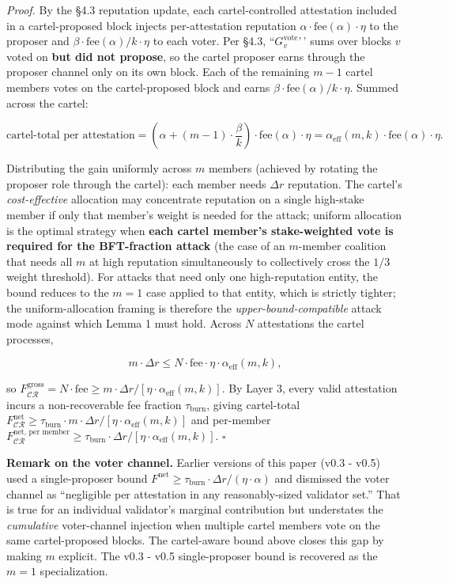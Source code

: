 \documentclass[
  11pt,
]{article}
\begin{document}
\emph{Proof.} By the §4.3 reputation update, each cartel-controlled
attestation included in a cartel-proposed block injects per-attestation
reputation \(\alpha \cdot \text{fee}(\alpha) \cdot \eta\) to the
proposer and \(\beta \cdot \text{fee}(\alpha) / k \cdot \eta\) to each
voter. Per §4.3, ``\(G_v^{\text{vote}}\)'\,' sums over blocks \(v\)
voted on \textbf{but did not propose}, so the cartel proposer earns
through the proposer channel only on its own block. Each of the
remaining \(m - 1\) cartel members votes on the cartel-proposed block
and earns \(\beta \cdot \text{fee}(\alpha) / k \cdot \eta\). Summed
across the cartel:

\[\text{cartel-total per attestation} = \left(\alpha + (m - 1) \cdot \frac{\beta}{k}\right) \cdot \text{fee}(\alpha) \cdot \eta = \alpha_{\text{eff}}(m, k) \cdot \text{fee}(\alpha) \cdot \eta.\]

Distributing the gain uniformly across \(m\) members (achieved by
rotating the proposer role through the cartel): each member needs
\(\Delta r\) reputation. The cartel's \emph{cost-effective} allocation
may concentrate reputation on a single high-stake member if only that
member's weight is needed for the attack; uniform allocation is the
optimal strategy when \textbf{each cartel member's stake-weighted vote
is required for the BFT-fraction attack} (the case of an \(m\)-member
coalition that needs all \(m\) at high reputation simultaneously to
collectively cross the \(1/3\) weight threshold). For attacks that need
only one high-reputation entity, the bound reduces to the \(m = 1\) case
applied to that entity, which is strictly tighter; the
uniform-allocation framing is therefore the
\emph{upper-bound-compatible} attack mode against which Lemma 1 must
hold. Across \(N\) attestations the cartel processes,

\[m \cdot \Delta r \leq N \cdot \text{fee} \cdot \eta \cdot \alpha_{\text{eff}}(m, k),\]

so
\(F_{\mathcal{CR}}^{\text{gross}} = N \cdot \text{fee} \geq m \cdot \Delta r / [\eta \cdot \alpha_{\text{eff}}(m, k)]\).
By Layer 3, every valid attestation incurs a non-recoverable fee
fraction \(\tau_{\text{burn}}\), giving cartel-total
\(F_{\mathcal{CR}}^{\text{net}} \geq \tau_{\text{burn}} \cdot m \cdot \Delta r / [\eta \cdot \alpha_{\text{eff}}(m, k)]\)
and per-member
\(F_{\mathcal{CR}}^{\text{net, per member}} \geq \tau_{\text{burn}} \cdot \Delta r / [\eta \cdot \alpha_{\text{eff}}(m, k)]\).
\(\square\)

\textbf{Remark on the voter channel.} Earlier versions of this paper
(v0.3 - v0.5) used a single-proposer bound
\(F^{\text{net}} \geq \tau_{\text{burn}} \cdot \Delta r / (\eta \cdot \alpha)\)
and dismissed the voter channel as ``negligible per attestation in any
reasonably-sized validator set.'' That is true for an individual
validator's marginal contribution but understates the \emph{cumulative}
voter-channel injection when multiple cartel members vote on the same
cartel-proposed blocks. The cartel-aware bound above closes this gap by
making \(m\) explicit. The v0.3 - v0.5 single-proposer bound is
recovered as the \(m = 1\) specialization.
\end{document}
